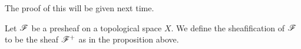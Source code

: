 The proof of this will be given next time. 

\begin{definition}[Sheafification]
Let $\mathscr{F}$ be a presheaf on a topological space $X$. We define the sheafification of $\mathscr{F}$ to be the sheaf $\mathscr{F}^+$ as in the proposition above. 
\end{definition}
